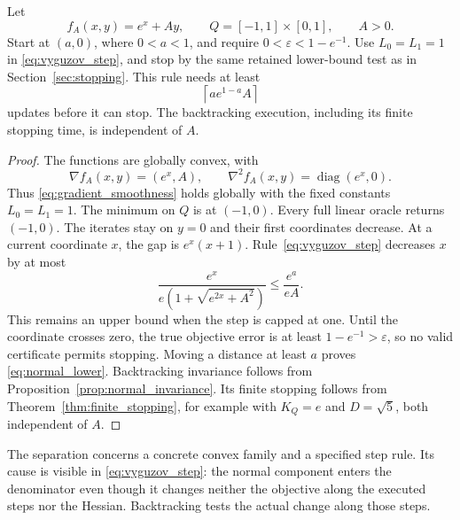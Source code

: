 \begin{theorem}
\label{thm:normal_separation}
Let
\[
 f_A(x,y)=e^x+Ay,\qquad Q=[-1,1]\times[0,1],\qquad A>0.
\]
Start at $(a,0)$, where $0<a<1$, and require
$0<\varepsilon<1-e^{-1}$. Use $L_0=L_1=1$ in
\eqref{eq:vyguzov_step}, and stop by the same retained lower-bound
test as in Section~\ref{sec:stopping}. This rule needs at least
\begin{equation}\label{eq:normal_lower}
 \left\lceil a e^{1-a}A\right\rceil
\end{equation}
updates before it can stop. The backtracking execution, including its
finite stopping time, is independent of $A$.
\end{theorem}
\begin{proof}
The functions are globally convex, with
\[
 \nabla f_A(x,y)=(e^x,A),\qquad
 \nabla^2f_A(x,y)=\operatorname{diag}(e^x,0).
\]
Thus \eqref{eq:gradient_smoothness} holds globally with the fixed
constants $L_0=L_1=1$. The minimum on $Q$ is at $(-1,0)$.
Every full linear oracle returns $(-1,0)$. The iterates stay on $y=0$
and their first coordinates decrease. At a current coordinate $x$,
the gap is $e^x(x+1)$. Rule~\eqref{eq:vyguzov_step} decreases $x$ by
at most
\[
 \frac{e^x}{e(1+\sqrt{e^{2x}+A^2})}
 \le\frac{e^a}{eA}.
\]
This remains an upper bound when the step is capped at one. Until the
coordinate crosses zero, the true objective error is at least
$1-e^{-1}>\varepsilon$, so no valid certificate permits stopping.
Moving a distance at least $a$ proves \eqref{eq:normal_lower}.
Backtracking invariance follows from Proposition~\ref{prop:normal_invariance}.
Its finite stopping follows from Theorem~\ref{thm:finite_stopping},
for example with $K_Q=e$ and $D=\sqrt5$, both independent of $A$.
\end{proof}

The separation concerns a concrete convex family and a specified step
rule. Its cause is visible in \eqref{eq:vyguzov_step}: the normal
component enters the denominator even though it changes neither the
objective along the executed steps nor the Hessian. Backtracking tests
the actual change along those steps.
